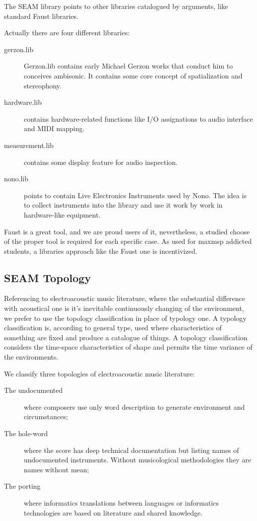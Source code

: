 \documentclass[twoside,a4paper]{article}
\begin{document}
The SEAM library points to other libraries catalogued by arguments, like standard Faust libraries. 

Actually there are four different libraries:
\begin{description}
\item[gerzon.lib] Gerzon.lib contains early Michael Gerzon works that conduct him to conceives ambisonic. It contains some core concept of spatialization and stereophony. 
\item[hardware.lib] contains hardware-related functions like I/O assignations to audio interface and MIDI mapping.
\item[measurement.lib] contains some display feature for audio inspection.
\item[nono.lib] points to contain Live Electronics Instruments used by Nono. The idea is to collect instruments into the library and use it work by work in hardware-like equipment. 
\end{description}

Faust is a great tool, and we are proud users of it, nevertheless, a studied choose of the proper tool is required for each specific case. As used for maxmsp addicted students, a libraries approach like the Faust one is incentivized.

\subsection{SEAM Topology}

Referencing to electroacoustic music literature, where the substantial difference with acoustical one is it's inevitable continuously changing of the environment, we prefer to use the topology classification in place of typology one. A typology classification is, according to general type, used where characteristics of something are fixed and produce a catalogue of things. A topology classification considers the time-space characteristics of shape and permits the time variance of the environments.

We classify three topologies of electroacoustic music literature:

\begin{description}
  \item[The undocumented] where composers use only word description to generate environment and circumstances;
  \item[The hole-word] where the score has deep technical documentation but listing names of undocumented instruments. Without musicological methodologies they are names without mean;
  \item[The porting] where informatics translations between languages or informatics technologies are based on literature and shared knowledge.
\end{description}
\end{document}
